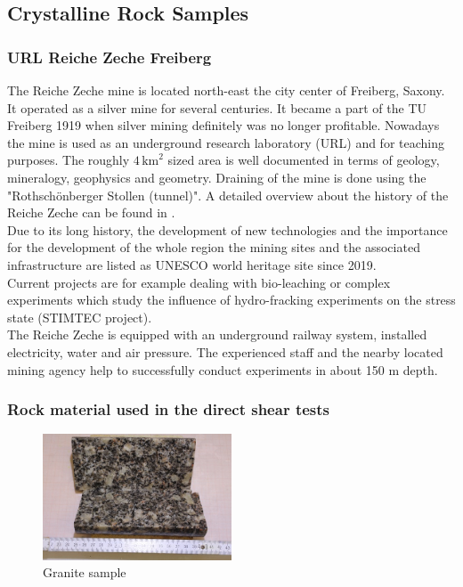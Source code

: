 \subsection{Crystalline Rock Samples}

\subsubsection{URL Reiche Zeche Freiberg}
The Reiche Zeche mine is located north-east the city center of Freiberg, Saxony. It operated as a silver mine for several centuries. It became a part of the TU Freiberg 1919 when silver mining definitely was no longer profitable. Nowadays the mine is used as an underground research laboratory (URL) and for teaching purposes. The roughly $4\,\text{km}^2$ sized area is well documented in terms of geology, mineralogy, geophysics and geometry. Draining of the mine is done using the "Rothsch\"onberger Stollen (tunnel)". A detailed overview about the history of the Reiche Zeche can be found in \cite{ReicheZecheHistory}.\\
Due to its long history, the development of new technologies and the importance for the development of the whole region the mining sites and the associated infrastructure are listed as UNESCO world heritage site since 2019.\\
Current projects are for example dealing with bio-leaching or complex experiments which study the influence of hydro-fracking experiments on the stress state (STIMTEC project).\\
The Reiche Zeche is equipped with an underground railway system, installed electricity, water and air pressure. The experienced staff and the nearby located mining agency help to successfully conduct experiments in about 150 m depth. 




\subsubsection{Rock material used in the direct shear tests}
\begin{figure}[!ht]
\begin{center}
\includegraphics[width=0.5\textwidth]{./figures/ExpRockGranite.JPG}
\end{center}
\caption{Granite sample}
\label{fig:RockGranite}
\end{figure}

